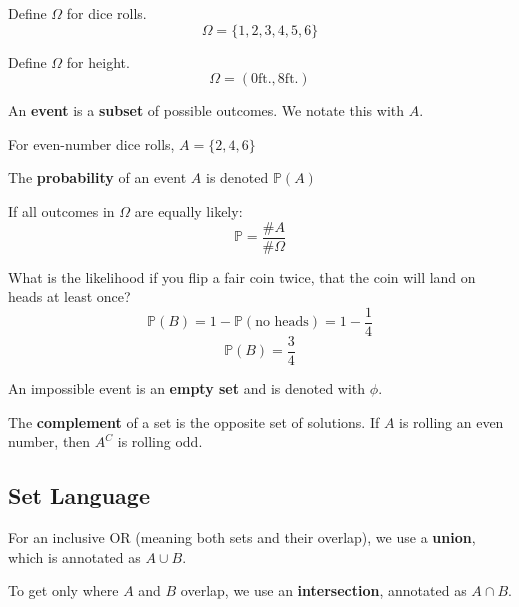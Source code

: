 \documentclass[titlepage, 12pt, leqno]{article}
\begin{document}
\begin{ex}
    Define $\Omega$ for dice rolls.
    \[
    \Omega = \{1,2,3,4,5,6\}
    \]
\end{ex}

\begin{ex}
    Define $\Omega$ for height.
    \[
    \Omega = (0\text{ft.}, 8\text{ft.})
    \]
\end{ex}

\begin{definition}
    An \textbf{event} is a \textbf{subset} of possible outcomes. We notate this with $A$.
\end{definition}

For even-number dice rolls, $A = \{2,4,6\}$ 

\begin{definition}
    The \textbf{probability} of an event $A$ is denoted $\mathbb{P}(A)$
\end{definition}
 
\begin{note}
    If all outcomes in $\Omega$ are equally likely:
    \[
    \mathbb{P} = \frac{\#A}{\#\Omega} 
    \]
\end{note}


\begin{ex}
    What is the likelihood if you flip a fair coin twice, that the coin will land on heads at least once?
    \[
    \mathbb{P}(B) = 1 - \mathbb{P}(\text{no heads}) = 1 - \frac{1}{4}
    \]
    \[
    \mathbb{P}(B) = \frac{3}{4} 
    \]
\end{ex}

\begin{definition}
    An impossible event is an \textbf{empty set} and is denoted with $\phi $.
\end{definition}

\begin{definition}
    The \textbf{complement} of a set is the opposite set of solutions. If $A$ is rolling an even number, then $A^C$ is rolling odd.
\end{definition}

\subsection{Set Language}
For an inclusive OR (meaning both sets and their overlap), we use a \textbf{union}, which is annotated as $A \cup B$.

To get only where $A$ and $B$ overlap, we use an \textbf{intersection}, annotated as $A \cap B$.
\end{document}

